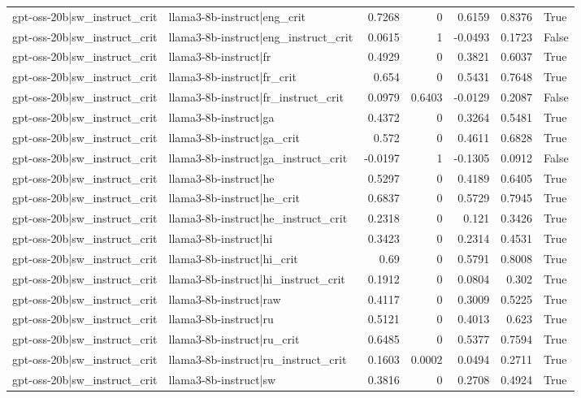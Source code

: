 \begin{table}
\begin{tabular}{l l r r r r l}
gpt-oss-20b|sw_instruct_crit & llama3-8b-instruct|eng_crit & 0.7268 & 0 & 0.6159 & 0.8376 & True \\
gpt-oss-20b|sw_instruct_crit & llama3-8b-instruct|eng_instruct_crit & 0.0615 & 1 & -0.0493 & 0.1723 & False \\
gpt-oss-20b|sw_instruct_crit & llama3-8b-instruct|fr & 0.4929 & 0 & 0.3821 & 0.6037 & True \\
gpt-oss-20b|sw_instruct_crit & llama3-8b-instruct|fr_crit & 0.654 & 0 & 0.5431 & 0.7648 & True \\
gpt-oss-20b|sw_instruct_crit & llama3-8b-instruct|fr_instruct_crit & 0.0979 & 0.6403 & -0.0129 & 0.2087 & False \\
gpt-oss-20b|sw_instruct_crit & llama3-8b-instruct|ga & 0.4372 & 0 & 0.3264 & 0.5481 & True \\
gpt-oss-20b|sw_instruct_crit & llama3-8b-instruct|ga_crit & 0.572 & 0 & 0.4611 & 0.6828 & True \\
gpt-oss-20b|sw_instruct_crit & llama3-8b-instruct|ga_instruct_crit & -0.0197 & 1 & -0.1305 & 0.0912 & False \\
gpt-oss-20b|sw_instruct_crit & llama3-8b-instruct|he & 0.5297 & 0 & 0.4189 & 0.6405 & True \\
gpt-oss-20b|sw_instruct_crit & llama3-8b-instruct|he_crit & 0.6837 & 0 & 0.5729 & 0.7945 & True \\
gpt-oss-20b|sw_instruct_crit & llama3-8b-instruct|he_instruct_crit & 0.2318 & 0 & 0.121 & 0.3426 & True \\
gpt-oss-20b|sw_instruct_crit & llama3-8b-instruct|hi & 0.3423 & 0 & 0.2314 & 0.4531 & True \\
gpt-oss-20b|sw_instruct_crit & llama3-8b-instruct|hi_crit & 0.69 & 0 & 0.5791 & 0.8008 & True \\
gpt-oss-20b|sw_instruct_crit & llama3-8b-instruct|hi_instruct_crit & 0.1912 & 0 & 0.0804 & 0.302 & True \\
gpt-oss-20b|sw_instruct_crit & llama3-8b-instruct|raw & 0.4117 & 0 & 0.3009 & 0.5225 & True \\
gpt-oss-20b|sw_instruct_crit & llama3-8b-instruct|ru & 0.5121 & 0 & 0.4013 & 0.623 & True \\
gpt-oss-20b|sw_instruct_crit & llama3-8b-instruct|ru_crit & 0.6485 & 0 & 0.5377 & 0.7594 & True \\
gpt-oss-20b|sw_instruct_crit & llama3-8b-instruct|ru_instruct_crit & 0.1603 & 0.0002 & 0.0494 & 0.2711 & True \\
gpt-oss-20b|sw_instruct_crit & llama3-8b-instruct|sw & 0.3816 & 0 & 0.2708 & 0.4924 & True \\

\end{tabular}
\end{table}
